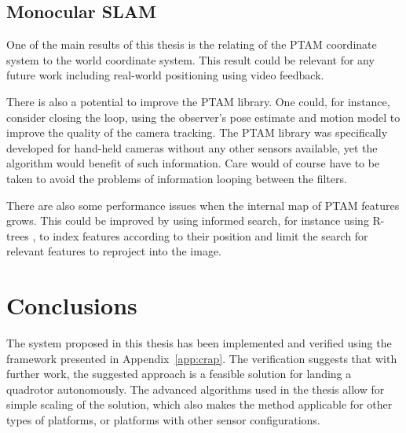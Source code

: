 
    \subsection{Monocular SLAM}
        One of the main results of this thesis is the relating of the PTAM
        coordinate system to the world coordinate system.
        This result could be relevant for any future work including real-world
        positioning using video feedback.

        There is also a potential to improve the PTAM library.
        One could, for instance, consider closing the loop, using the observer's
        pose estimate and motion model to improve the quality of the camera tracking.
        The PTAM library was specifically developed for hand-held cameras
        without any other sensors available, yet the algorithm would benefit
        of such information.
        Care would of course have to be taken to avoid the problems of
        information looping between the filters.

        There are also some performance issues when the internal map of PTAM features
        grows. This could be improved by using informed search,
        for instance using R-trees%
        , to index features according to their position and limit the search for
        relevant features to reproject into the image.


\section{Conclusions}
    The system proposed in this thesis has been implemented and verified
    using the framework presented in Appendix~\ref{app:crap}.
    The verification suggests that with further work, the suggested approach
    is a feasible solution for landing a quadrotor autonomously.
    The advanced algorithms used in the thesis allow for
    simple scaling of the solution, which also makes the method applicable
    for other types of platforms, or platforms with other sensor configurations.

